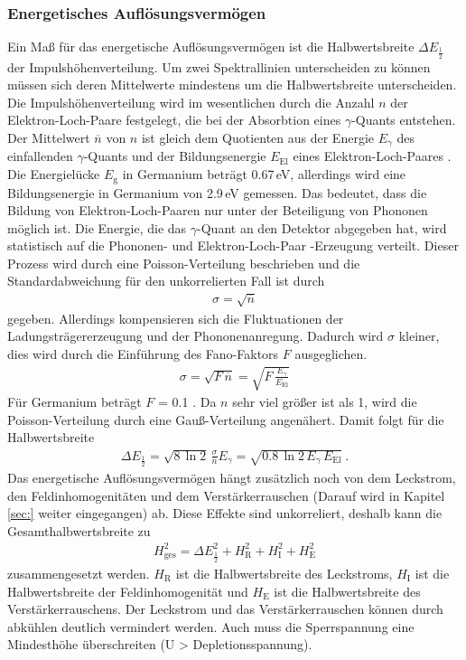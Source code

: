 \subsubsection{Energetisches Auflösungsvermögen}
\label{sec:EAuflösung}
Ein Maß für das energetische Auflösungsvermögen ist die Halbwertsbreite $\Delta E_\frac{1}{2}$ der Impulshöhenverteilung. Um zwei Spektrallinien unterscheiden zu können müssen sich deren Mittelwerte mindestens um die Halbwertsbreite unterscheiden. \\
Die Impulshöhenverteilung wird im wesentlichen durch die Anzahl $n$ der Elektron-Loch-Paare festgelegt, die bei der Absorbtion eines $\gamma$-Quants entstehen. Der Mittelwert $\overline{n}$ von $n$ ist gleich dem Quotienten aus der Energie $E_\gamma$ des einfallenden $\gamma$-Quants und der Bildungsenergie $E_\text{El}$ eines Elektron-Loch-Paares \cite[14]{V18}. Die Energielücke $E_\text{g}$ in Germanium beträgt 0.67\,eV, allerdings wird eine Bildungsenergie in Germanium von 2.9\,eV gemessen. Das bedeutet, dass die Bildung von Elektron-Loch-Paaren nur unter der Beteiligung von Phononen möglich ist. Die Energie, die das $\gamma$-Quant an den Detektor abgegeben hat, wird statistisch auf die Phononen- und Elektron-Loch-Paar -Erzeugung verteilt. Dieser Prozess wird durch eine Poisson-Verteilung beschrieben und die Standardabweichung für den unkorrelierten Fall ist durch
\begin{align}
	\sigma = \sqrt{\overline{n}}
\end{align}
gegeben. Allerdings kompensieren sich die Fluktuationen der Ladungsträgererzeugung und der Phononenanregung. Dadurch wird $\sigma$ kleiner, dies wird durch die Einführung des Fano-Faktors $F$ ausgeglichen.
\begin{align}
	\sigma = \sqrt{F\,\overline{n}} = \sqrt{F\,\frac{E_\gamma}{E_\text{El}}}
\end{align}
Für Germanium beträgt $F$ = 0.1 \cite[15]{V18}. Da $n$ sehr viel größer ist als 1, wird die Poisson-Verteilung durch eine Gauß-Verteilung angenähert. Damit folgt für die Halbwertsbreite
\begin{align}
	\Delta E_\frac{1}{2} = \sqrt{8\,\ln2} \, \frac{\sigma} {\overline{n}} E_\gamma = \sqrt{0.8\,\ln2\,E_\gamma \, E_\text{El}} \ .
\end{align}
Das energetische Auflösungsvermögen hängt zusätzlich noch von dem Leckstrom, den Feldinhomogenitäten und dem Verstärkerrauschen (Darauf wird in Kapitel \eqref{sec:} weiter eingegangen) ab. Diese Effekte sind unkorreliert, deshalb kann die Gesamthalbwertsbreite zu
\begin{align}
	H_\text{ges}^2 = \Delta E_\frac{1}{2}^2 + H_\text{R}^2 + H_\text{I}^2 + H_\text{E}^2
\end{align}
zusammengesetzt werden. $H_\text{R}$ ist die Halbwertsbreite des Leckstroms, $H_\text{I}$ ist die Halbwertsbreite der Feldinhomogenität und $H_\text{E}$ ist die Halbwertsbreite des Verstärkerrauschens. Der Leckstrom und das Verstärkerrauschen können durch abkühlen deutlich vermindert werden. Auch muss die Sperrspannung eine Mindesthöhe überschreiten (U > Depletionsspannung).



